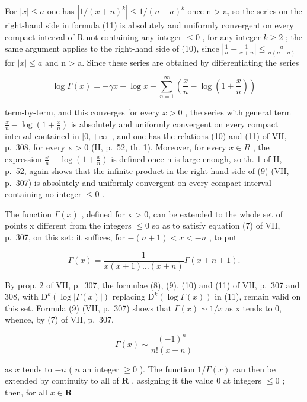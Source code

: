 For \(|x| \leqslant a\) one has \(\left|1/(x+n)^{k}\right| \leqslant 1/(n-a)^{k}\) once n \textgreater{} a, so the series on the right-hand side in formula (11) is absolutely and uniformly convergent on every compact interval of R not containing any integer \(\leqslant 0\) , for any integer \(k \geqslant 2\) ; the same argument applies to the right-hand side of (10), since \(\left|\frac{1}{n}-\frac{1}{x+n}\right| \leqslant \frac{a}{n(n-a)}\) for \(|x| \leqslant a\) and n \textgreater{} a. Since these series are obtained by differentiating the series

\[
\log \Gamma (x) = - \gamma x - \log x + \sum_ {n = 1} ^ {\infty} \left(\frac {x}{n} - \log \left(1 + \frac {x}{n}\right)\right)
\]

term-by-term, and this converges for every \(x > 0\) , the series with general term \(\frac{x}{n} - \log \left(1 + \frac{x}{n}\right)\) is absolutely and uniformly convergent on every compact interval contained in \([0, +\infty[\) , and one has the relations (10) and (11) of VII, p.~308, for every x \textgreater{} 0 (II, p.~52, th. 1). Moreover, for every \(x \in R\) , the expression \(\frac{x}{n} - \log\left(1 + \frac{x}{n}\right)\) is defined once n is large enough, so th. 1 of II, p.~52, again shows that the infinite product in the right-hand side of (9) (VII, p.~307) is absolutely and uniformly convergent on every compact interval containing no integer \(\leqslant 0\) .

The function \(\Gamma(x)\) , defined for x \textgreater{} 0, can be extended to the whole set of points x different from the integers \(\leqslant 0\) so as to satisfy equation (7) of VII, p.~307, on this set: it suffices, for \(-(n + 1) < x < -n\) , to put

\[
\Gamma (x) = \frac {1}{x (x + 1) \ldots (x + n)} \Gamma (x + n + 1).
\]

By prop. 2 of VII, p.~307, the formulae (8), (9), (10) and (11) of VII, p.~307 and 308, with \(\mathrm{D}^{k}(\log|\Gamma(x)|)\) replacing \(\mathrm{D}^{k}(\log\Gamma(x))\) in (11), remain valid on this set. Formula (9) (VII, p.~307) shows that \(\Gamma(x)\sim1/x\) as x tends to 0, whence, by (7) of VII, p.~307,

\[
\Gamma (x) \sim \frac {(- 1) ^ {n}}{n ! (x + n)}
\]

as \(x\) tends to \(-n\) ( \(n\) an integer \(\geqslant 0\) ). The function \(1 / \Gamma(x)\) can then be extended by continuity to all of \(\mathbf{R}\) , assigning it the value 0 at integers \(\leqslant 0\) ; then, for all \(x \in \mathbf{R}\)

